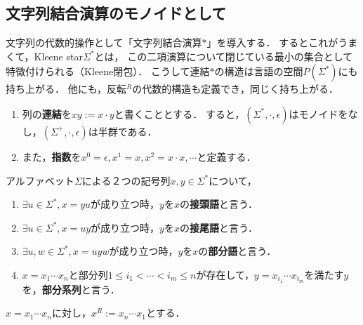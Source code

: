 \subsection{文字列結合演算のモノイドとして}

\begin{tcolorbox}[colframe=ForestGreen, colback=ForestGreen!10!white, breakable]
    文字列の代数的操作として「文字列結合演算$*$」を導入する．
    するとこれがうまくて，Kleene star$\Sigma^*$とは，
    この二項演算について閉じている最小の集合として特徴付けられる（Kleene閉包）．
    こうして連結$*$の構造は言語の空間$P(\Sigma^*)$にも持ち上がる．
    他にも，反転${}^R$の代数的構造も定義でき，同じく持ち上がる．
\end{tcolorbox}

\begin{definition}\mbox{}\label{def-concatenation-of-words}
    \begin{enumerate}
        \item 列の\textbf{連結}を$xy:=x\cdot y$と書くこととする．
        すると，$(\Sigma^*,\cdot,\epsilon)$はモノイドをなし，$(\Sigma^+,\cdot,\epsilon)$は半群である．
        \item また，\textbf{指数}を$x^0=\epsilon,x^1=x,x^2=x\cdot x,\cdots$と定義する．
    \end{enumerate}
\end{definition}

\begin{definition}
    アルファベット$\Sigma$による２つの記号列$x,y\in\Sigma^*$について，
    \begin{enumerate}
        \item $\exists u\in\Sigma^*, x=yu$が成り立つ時，$y$を$x$の\textbf{接頭語}と言う．
        \item $\exists u\in\Sigma^*,x=uy$が成り立つ時，$y$を$x$の\textbf{接尾語}と言う．
        \item $\exists u,w\in\Sigma^*,x=uyw$が成り立つ時，$y$を$x$の\textbf{部分語}と言う．
        \item $x=x_1\cdots x_n$と部分列$1\le i_1<\cdots<i_m\le n$が存在して，$y=x_{i_1}\cdots x_{i_m}$を満たす$y$を，\textbf{部分系列}と言う．
    \end{enumerate}
\end{definition}

\begin{definition}[reverse]
    $x=x_1\cdots x_n$に対し，$x^R:=x_n\cdots x_1$とする．
\end{definition}

